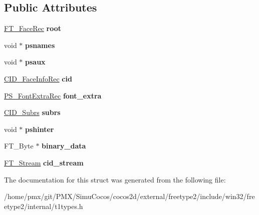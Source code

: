 \subsection*{Public Attributes}
\begin{DoxyCompactItemize}
\item 
\mbox{\label{structCID__FaceRec___aeeb09d3feaa016b664e1c5bf95a6f232}} 
\hyperlink{structFT__FaceRec__}{F\+T\+\_\+\+Face\+Rec} {\bfseries root}
\item 
\mbox{\label{structCID__FaceRec___a9a15fe0295e90627bf4989aa0e1db869}} 
void $\ast$ {\bfseries psnames}
\item 
\mbox{\label{structCID__FaceRec___a200fe31b3cc0af462adde703abdfb523}} 
void $\ast$ {\bfseries psaux}
\item 
\mbox{\label{structCID__FaceRec___a00bc02f259a47704eb471d38c573bd4c}} 
\hyperlink{structCID__FaceInfoRec__}{C\+I\+D\+\_\+\+Face\+Info\+Rec} {\bfseries cid}
\item 
\mbox{\label{structCID__FaceRec___aba208398d42242870890625f993caa81}} 
\hyperlink{structPS__FontExtraRec__}{P\+S\+\_\+\+Font\+Extra\+Rec} {\bfseries font\+\_\+extra}
\item 
\mbox{\label{structCID__FaceRec___aa842e3eb5a5092dd0fc2c0ecf7bd692b}} 
\hyperlink{structCID__SubrsRec__}{C\+I\+D\+\_\+\+Subrs} {\bfseries subrs}
\item 
\mbox{\label{structCID__FaceRec___ad65e084daf510c916c99a23df0fa6c0b}} 
void $\ast$ {\bfseries pshinter}
\item 
\mbox{\label{structCID__FaceRec___a0d90432366d83d0ea399e587f020b328}} 
F\+T\+\_\+\+Byte $\ast$ {\bfseries binary\+\_\+data}
\item 
\mbox{\label{structCID__FaceRec___a2be5991aa14a8f599c02b1cdfc547e25}} 
\hyperlink{structFT__StreamRec__}{F\+T\+\_\+\+Stream} {\bfseries cid\+\_\+stream}
\end{DoxyCompactItemize}


The documentation for this struct was generated from the following file\+:\begin{DoxyCompactItemize}
\item 
/home/pmx/git/\+P\+M\+X/\+Simu\+Cocos/cocos2d/external/freetype2/include/win32/freetype2/internal/t1types.\+h\end{DoxyCompactItemize}
